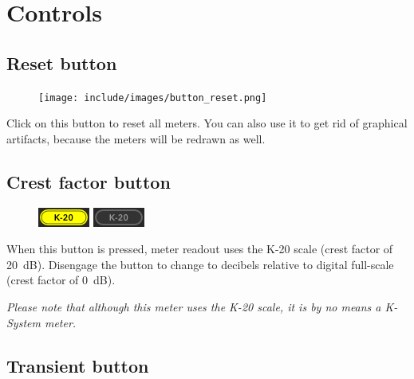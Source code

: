 \chapter{Controls}
\label{chap:controls}

\section{Reset button}
\label{sec:reset_button}

\begin{figure}
  \texttt{[image: include/images/button\_reset.png]}
\end{figure}

Click on this button to reset all meters.  You can also use it to get
rid of graphical artifacts, because the meters will be redrawn as
well.

\section{Crest factor button}
\label{sec:crest_factor_button}

\begin{figure}
  \includegraphics[scale=\screenshotscale,clip]{include/images/button_crest_factor_on.png}
  \newline \vspace{-0.9\baselineskip}
  \includegraphics[scale=\screenshotscale,clip]{include/images/button_crest_factor_off.png}
\end{figure}

When this button is pressed, meter readout uses the K-20 scale (crest
factor of \SI{20}{\dB}).  Disengage the button to change to decibels
relative to digital full-scale (crest factor of \SI{0}{\dB}).

\emph{Please note that although this meter uses the K-20 scale, it is
  by no means a K-System meter.}

\newpage %

\section{Transient button}
\label{sec:transient_button}

